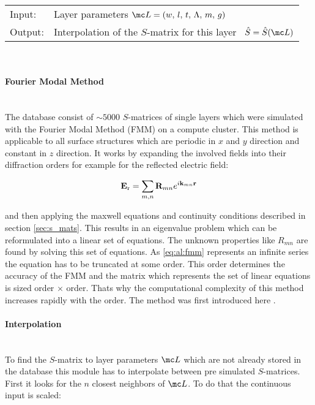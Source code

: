 \begin{tabular}{ll}
    \toprule
    Input: & Layer parameters 
    $\mc L = (w, \, l, \, t, \, \Lambda, \, m, \, g)$\\
    Output: & Interpolation of the $S$-matrix for this layer \
    $\hat{S} = \hat{S}(\mc L)$\\
    \bottomrule
\end{tabular}
\\

\paragraph{Fourier Modal Method} ~\\
The database consist of $\sim 5000$ $S$-matrices of single layers which were simulated with the Fourier Modal Method (FMM) on a compute cluster. This method is applicable to all surface structures which are periodic in $x$ and $y$ direction and constant in $z$ direction. It works by expanding the involved fields into their diffraction orders for example for the reflected electric field:

\begin{equation} \label{eq:al:fmm}
    \vb E_{\mathrm{r}} = \sum_{m,n} \vb R_{mn} e^{i \vb k_{mn} \vb r}
\end{equation}

and then applying the maxwell equations and continuity conditions described in section \ref{sec:s_mats}. This results in an eigenvalue problem which can be reformulated into a linear set of equations. The unknown properties like $R_{mn}$ are found by solving this set of equations. As \eqref{eq:al:fmm} represents an infinite series the equation has to be truncated at some order. This order determines the accuracy of the FMM and the matrix which represents the set of linear equations is sized order $\times$ order. Thats why the computational complexity of this method increases rapidly with the order. The method was first introduced here \cite{Noponen1994}.

\paragraph{Interpolation} ~\\
To find the $S$-matrix to layer parameters $\mc L$ which are not already stored in the database this module has to interpolate between pre simulated $S$-matrices. First it looks for the $n$ closest neighbors of $\mc L$. To do that the continuous input is scaled:

